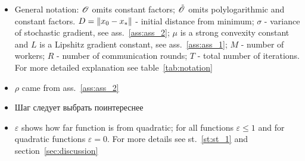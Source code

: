 \begin{table}[H]
\begin{adjustwidth}{-5cm}{-5cm}
\begin{threeparttable}
\begin{tabular}{|p{2cm}|p{1.7cm}|p{1.7cm}|p{1.5cm}|p{1.5cm}|p{6cm}|}
\end{tabular}
\begin{tablenotes}
\begin{itemize}
    \item General notation: 
    $\mathcal{O}$ omits constant factors;
    $\tilde{\mathcal{O}}$ omits polylogarithmic and constant factors.
    $D = \left\|x_0-x_*\right\|$ - initial distance from minimum;
    $\sigma$ - variance of stochastic gradient, see ass.~\ref{ass:ass_2}; 
    $\mu$ is a strong convexity constant 
    and $L$ is a Lipshitz gradient constant, see ass.~\ref{ass:ass_1};
    $M$ - number of workers;
    $R$ - number of communication rounds;
    $T$ - total number of iterations. For more detailed explanation see table~\ref{tab:notation}
    
    \item {} $\rho$ came from ass.~\ref{ass:ass_2}

    \item {} Шаг следует выбрать поинтереснее
    
    \item {} $\varepsilon$ shows how far function is from quadratic; 
    for all functions $\varepsilon \leq 1$ and for quadratic functions $\varepsilon = 0$. For more details see st.~\ref{st:st_1} and section~\ref{sec:discussion}
\end{itemize}
\end{tablenotes}
\end{threeparttable}

\end{adjustwidth} %

\label{tab:different_row_counts}

\end{table}
